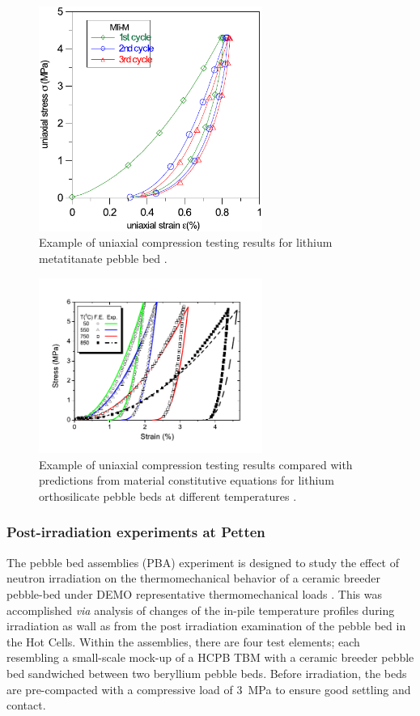 \documentclass[11pt]{report} %
\begin{document}
\begin{figure}[h]
    \centering
    \includegraphics[width=0.65\textwidth]{images/Fig-1}
    \caption{Example of uniaxial compression testing results for lithium metatitanate pebble bed \cite{vanderlaan2011}.}
    \label{fig:mti}
\end{figure}

\begin{figure}[h]
    \centering
    \includegraphics[width=0.65\textwidth]{images/Fig-2}
    \caption{Example of uniaxial compression testing results compared with predictions from material constitutive equations for lithium orthosilicate pebble beds at different temperatures \cite{Gan:2008kx}.}
    \label{fig:UCT}
\end{figure}


\subsubsection{Post-irradiation experiments at Petten}
The pebble bed assemblies (PBA) experiment is designed to study the effect of neutron irradiation on the thermomechanical behavior of a ceramic breeder pebble-bed under DEMO representative thermomechanical loads \cite{Magielsen2007}. This was accomplished \textit{via} analysis of changes of the in-pile temperature profiles during irradiation as wall as from the post irradiation examination of the pebble bed in the Hot Cells. Within the assemblies, there are four test elements; each resembling a small-scale mock-up of a HCPB TBM with a ceramic breeder pebble bed sandwiched between two beryllium pebble beds. Before irradiation, the beds are pre-compacted with a compressive load of \SI{3}{\mega\pascal} to ensure good settling and contact.
\end{document}

